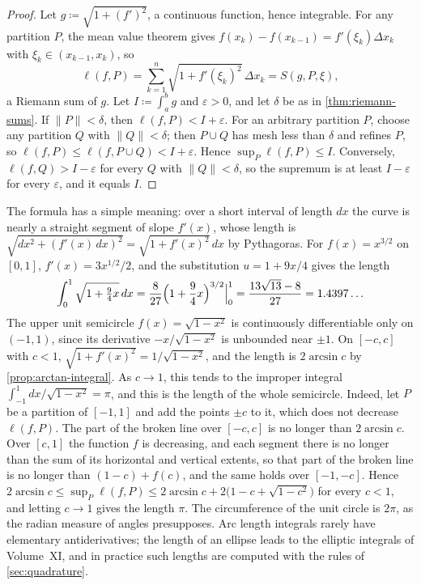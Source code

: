 \begin{proof}
Let $g\coloneqq\sqrt{1+(f')^2}$, a continuous function, hence integrable. For any partition $P$, the mean value theorem gives $f(x_k)-f(x_{k-1})=f'(\xi_k)\Delta x_k$ with $\xi_k\in(x_{k-1},x_k)$, so
\[
\ell(f,P)=\sum_{k=1}^n\sqrt{1+f'(\xi_k)^2}\,\Delta x_k=S(g,P,\xi),
\]
a Riemann sum of $g$. Let $I\coloneqq\int_a^bg$ and $\varepsilon>0$, and let $\delta$ be as in \cref{thm:riemann-sums}. If $\|P\|<\delta$, then $\ell(f,P)<I+\varepsilon$. For an arbitrary partition $P$, choose any partition $Q$ with $\|Q\|<\delta$; then $P\cup Q$ has mesh less than $\delta$ and refines $P$, so $\ell(f,P)\le\ell(f,P\cup Q)<I+\varepsilon$. Hence $\sup_P\ell(f,P)\le I$. Conversely, $\ell(f,Q)>I-\varepsilon$ for every $Q$ with $\|Q\|<\delta$, so the supremum is at least $I-\varepsilon$ for every $\varepsilon$, and it equals $I$.
\end{proof}

The formula has a simple meaning: over a short interval of length $dx$ the curve is nearly a straight segment of slope $f'(x)$, whose length is $\sqrt{dx^2+(f'(x)\,dx)^2}=\sqrt{1+f'(x)^2}\,dx$ by Pythagoras. For $f(x)=x^{3/2}$ on $[0,1]$, $f'(x)=3x^{1/2}/2$, and the substitution $u=1+9x/4$ gives the length
\[
\int_0^1\sqrt{1+\tfrac94x}\,dx=\frac8{27}\Bigl(1+\frac94x\Bigr)^{3/2}\Big|_0^1=\frac{13\sqrt{13}-8}{27}=1.4397\ldots
\]
The upper unit semicircle $f(x)=\sqrt{1-x^2}$ is continuously differentiable only on $(-1,1)$, since its derivative $-x/\sqrt{1-x^2}$ is unbounded near $\pm1$. On $[-c,c]$ with $c<1$, $\sqrt{1+f'(x)^2}=1/\sqrt{1-x^2}$, and the length is $2\arcsin c$ by \cref{prop:arctan-integral}. As $c\to1$, this tends to the improper integral $\int_{-1}^1dx/\sqrt{1-x^2}=\pi$, and this is the length of the whole semicircle. Indeed, let $P$ be a partition of $[-1,1]$ and add the points $\pm c$ to it, which does not decrease $\ell(f,P)$. The part of the broken line over $[-c,c]$ is no longer than $2\arcsin c$. Over $[c,1]$ the function $f$ is decreasing, and each segment there is no longer than the sum of its horizontal and vertical extents, so that part of the broken line is no longer than $(1-c)+f(c)$, and the same holds over $[-1,-c]$. Hence $2\arcsin c\le\sup_P\ell(f,P)\le2\arcsin c+2\bigl(1-c+\sqrt{1-c^2}\bigr)$ for every $c<1$, and letting $c\to1$ gives the length $\pi$. The circumference of the unit circle is $2\pi$, as the radian measure of angles presupposes. Arc length integrals rarely have elementary antiderivatives; the length of an ellipse leads to the elliptic integrals of Volume~XI, and in practice such lengths are computed with the rules of \cref{sec:quadrature}.

